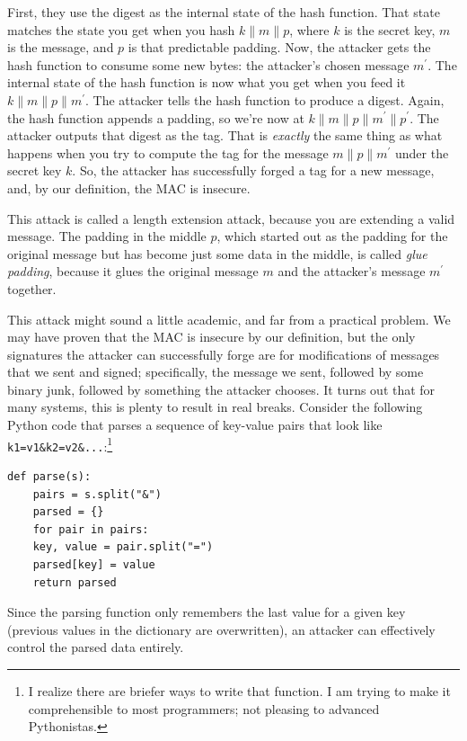 \documentclass[11pt,ebook,table,dvipsnames]{memoir}
\begin{document}
First, they use the digest as the internal state of the hash function.
That state matches the state you get when you hash $k \| m \| p$,
where $k$ is the secret key, $m$ is the message, and $p$ is that
predictable padding. Now, the attacker gets the hash function to
consume some new bytes: the attacker's chosen message $m^{\prime}$.
The internal state of the hash function is now what you get when you
feed it $k \| m \| p \| m^{\prime}$. The attacker tells the hash
function to produce a digest. Again, the hash function appends a
padding, so we're now at $k \| m \| p \| m^{\prime} \| p^{\prime}$.
The attacker outputs that digest as the tag. That is \emph{exactly} the
same thing as what happens when you try to compute the tag for the
message $m \| p \| m^{\prime}$ under the secret key $k$. So, the
attacker has successfully forged a tag for a new message, and, by our
definition, the MAC is insecure.

This attack is called a length extension attack, because you are
extending a valid message. The padding in the middle $p$, which
started out as the padding for the original message but has become
just some data in the middle, is called \emph{glue padding}, because it
glues the original message $m$ and the attacker's message $m^{\prime}$
together.

This attack might sound a little academic, and far from a practical
problem. We may have proven that the MAC is insecure by our
definition, but the only signatures the attacker can successfully
forge are for modifications of messages that we sent and signed;
specifically, the message we sent, followed by some binary junk,
followed by something the attacker chooses. It turns out that for many
systems, this is plenty to result in real breaks. Consider the
following Python code that parses a sequence of key-value pairs that
look like \verb~k1=v1&k2=v2&...~:\footnote{I realize there are briefer ways to
write that function. I am trying to make it comprehensible to most
programmers; not pleasing to advanced Pythonistas.}

\begin{verbatim}
def parse(s):
    pairs = s.split("&")
    parsed = {}
    for pair in pairs:
	key, value = pair.split("=")
	parsed[key] = value
    return parsed
\end{verbatim}

Since the parsing function only remembers the last value for a given
key (previous values in the dictionary are overwritten), an attacker
can effectively control the parsed data entirely.
\end{document}
